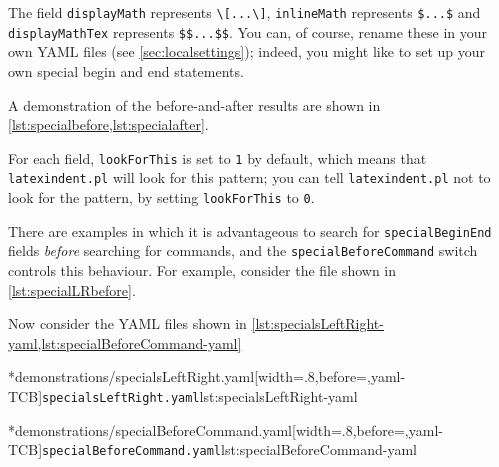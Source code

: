 	The field \texttt{displayMath} represents \lstinline!\[...\]!, \texttt{inlineMath} represents
	\lstinline!$...$! and \texttt{displayMathTex} represents \lstinline!$$...$$!. You can, of course,
	rename these in your own YAML files (see \vref{sec:localsettings}); indeed, you
	might like to set up your own special begin and end statements.

	A demonstration of the before-and-after results are shown in \cref{lst:specialbefore,lst:specialafter}.

	\begin{minipage}{.45\textwidth}
	\end{minipage}%
	\hfill
	\begin{minipage}{.45\textwidth}
	\end{minipage}

	For each field, \texttt{lookForThis} is set to \texttt{1} by default, which means that \texttt{latexindent.pl}
	will look for this pattern; you can tell \texttt{latexindent.pl} not to look for the pattern, by setting
	\texttt{lookForThis} to \texttt{0}.

	There are%
	 examples in which it is advantageous to search for \texttt{specialBeginEnd} fields \emph{before}
	searching for commands, and the \texttt{specialBeforeCommand} switch controls this behaviour. For example, consider
	the file shown in \cref{lst:specialLRbefore}.


	Now consider the YAML files shown in \cref{lst:specialsLeftRight-yaml,lst:specialBeforeCommand-yaml}

	\begin{minipage}{.49\linewidth}
		\cmhlistingsfromfile[]*{demonstrations/specialsLeftRight.yaml}[width=.8\linewidth,before=\centering,yaml-TCB]{\texttt{specialsLeftRight.yaml}}{lst:specialsLeftRight-yaml}
	\end{minipage}
	\hfill
	\begin{minipage}{.49\linewidth}
		\cmhlistingsfromfile[]*{demonstrations/specialBeforeCommand.yaml}[width=.8\linewidth,before=\centering,yaml-TCB]{\texttt{specialBeforeCommand.yaml}}{lst:specialBeforeCommand-yaml}
	\end{minipage}

